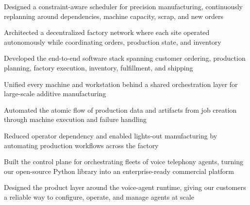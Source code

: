 

\begin{bullets}
\item Designed a constraint-aware scheduler for precision manufacturing, continuously replanning around dependencies, machine capacity, scrap, and new orders
\item Architected a decentralized factory network where each site operated autonomously while coordinating orders, production state, and inventory
\item Developed the end-to-end software stack spanning customer ordering, production planning, factory execution, inventory, fulfillment, and shipping
\end{bullets}

\jobsep
{}

\begin{bullets}
\item Unified every machine and workstation behind a shared orchestration layer for large-scale additive manufacturing
\item Automated the atomic flow of production data and artifacts from job creation through machine execution and failure handling
\item Reduced operator dependency and enabled lights-out manufacturing by automating production workflows across the factory
\end{bullets}

\jobsep
{}

\begin{bullets}
\item Built the control plane for orchestrating fleets of voice telephony agents, turning our open-source Python library into an enterprise-ready commercial platform
\item Designed the product layer around the voice-agent runtime, giving our customers a reliable way to configure, operate, and manage agents at scale
\end{bullets}

\jobsep
{}

